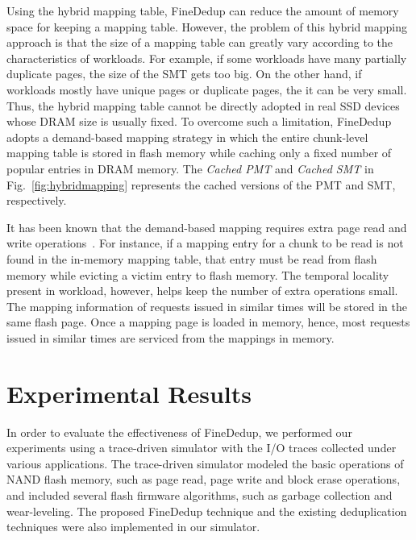 Using the hybrid mapping table, 
FineDedup can reduce the amount of memory space for keeping a mapping table.
However, the problem of this hybrid mapping approach is that 
the size of a mapping table can greatly vary according to the characteristics of workloads.
For example, if some workloads have many partially duplicate pages, 
the size of the SMT gets too big.
On the other hand, if workloads mostly have unique pages or duplicate pages, 
the it can be very small.
Thus, the hybrid mapping table cannot be directly adopted in real SSD devices whose DRAM size is usually fixed.
To overcome such a limitation, 
FineDedup adopts a demand-based mapping strategy in which
the entire chunk-level mapping table is stored in flash memory
while caching only a fixed number of popular entries in DRAM memory.
The \textit{Cached PMT} and \textit{Cached SMT} in Fig.~\ref{fig:hybridmapping} represents the cached versions of the
PMT and SMT, respectively.

It has been known that the demand-based mapping requires extra page read and write operations~\cite{dftl}.
For instance,
if a mapping entry for a chunk to be read is not found in the in-memory mapping table,
that entry must be read from flash memory while evicting a victim entry to flash memory.
The temporal locality present in workload, however, helps keep the number of extra operations small.
The mapping information of requests issued in similar times will be stored in the same flash page.
Once a mapping page is loaded in memory, hence,
most requests issued in similar times are serviced from the mappings in memory.

\section{Experimental Results}
\label{sec:finededup_experimentalresult}



In order to evaluate the effectiveness of FineDedup, 
we performed our experiments using a trace-driven simulator with the I/O traces collected under various applications.
The trace-driven simulator modeled the basic operations of NAND flash memory, 
such as page read, page write and block erase operations,
and included several flash firmware algorithms, 
such as garbage collection and wear-leveling.
The proposed FineDedup technique and the existing deduplication techniques were also implemented in our simulator.


